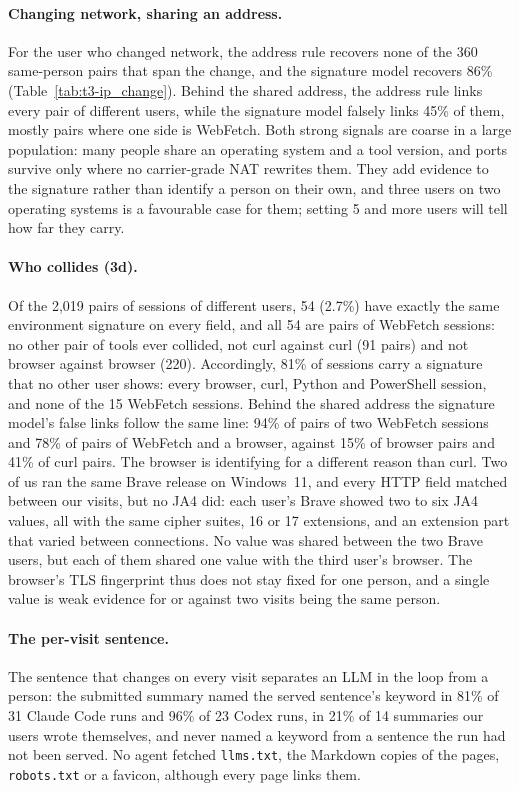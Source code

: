\paragraph{Changing network, sharing an address.} For the user who changed network, the address rule
recovers none of the 360 same-person pairs that span the change, and the signature model recovers 86\%
(Table~\ref{tab:t3-ip_change}). Behind the shared address, the address rule links every pair of different
users, while the signature model falsely links 45\% of them, mostly pairs where one side is WebFetch.
Both strong signals are coarse in a large population: many people share an operating system and a tool
version, and ports survive only where no carrier-grade NAT rewrites them. They add evidence to the
signature rather than identify a person on their own, and three users on two operating systems is a
favourable case for them; setting 5 and more users will tell how far they carry.

\paragraph{Who collides (3d).} Of the 2,019 pairs of sessions of different users, 54 (2.7\%) have exactly
the same environment signature on every field, and all 54 are pairs of WebFetch sessions: no other pair of
tools ever collided, not curl against curl (91 pairs) and not browser against browser (220). Accordingly,
81\% of sessions carry a signature that no other user shows: every browser, curl, Python and PowerShell
session, and none of the 15 WebFetch sessions. Behind the shared address the signature model's false links
follow the same line: 94\% of pairs of two WebFetch sessions and 78\% of pairs of WebFetch and a browser,
against 15\% of browser pairs and 41\% of curl pairs. The browser is identifying for a different reason
than curl. Two of us ran the same Brave release on Windows~11, and every HTTP field matched between our
visits, but no JA4 did: each user's Brave showed two to six JA4 values, all with the same cipher suites,
16 or 17 extensions, and an extension part that varied between connections. No value was shared
between the two Brave users, but each of them shared one value with the third user's browser. The
browser's TLS fingerprint thus does not stay fixed for one person, and a single value is weak evidence
for or against two visits being the same person.

\paragraph{The per-visit sentence.} The sentence that changes on every visit separates an LLM in the
loop from a person: the submitted summary named the served sentence's keyword in 81\% of 31 Claude Code
runs and 96\% of 23 Codex runs, in 21\% of 14 summaries our users wrote themselves, and never named a
keyword from a sentence the run had not been served. No agent fetched \texttt{llms.txt}, the Markdown
copies of the pages, \texttt{robots.txt} or a favicon, although every page links them.

